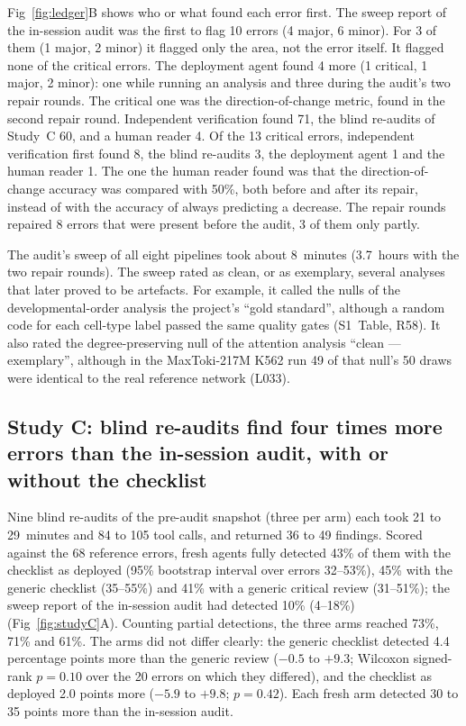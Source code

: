 Fig~\ref{fig:ledger}B shows who or what found each error first. The
sweep report of the in-session audit was the first to flag 10 errors (4
major, 6 minor). For 3 of them (1 major, 2 minor) it flagged only the
area, not the error itself. It flagged none of the critical errors. The
deployment agent found 4 more (1 critical, 1 major, 2 minor): one while
running an analysis and three during the audit's two repair rounds. The
critical one was the direction-of-change metric, found in the second
repair round. Independent verification found 71, the blind re-audits of
Study~C 60, and a human reader 4. Of the 13 critical errors, independent
verification first found 8, the blind re-audits 3, the deployment agent 1
and the human reader 1. The one the human reader found was that the
direction-of-change accuracy was compared with 50\%, both before and after
its repair, instead of with the accuracy of always predicting a decrease.
The repair rounds repaired 8 errors that were present before the audit,
3 of them only partly.

The audit's sweep of all eight pipelines took about 8~minutes (3.7~hours
with the two repair rounds). The sweep rated as
clean, or as exemplary, several analyses that later proved to be
artefacts. For example, it called the nulls of the developmental-order
analysis the project's ``gold standard'', although a random code for each
cell-type label passed the same quality gates (S1~Table, R58). It also
rated the degree-preserving null of the attention analysis ``clean ---
exemplary'', although in the MaxToki-217M K562 run 49 of that null's 50
draws were identical to the real reference network (L033).

\subsection*{Study C: blind re-audits find four times more errors than the in-session audit, with or without the checklist}
Nine blind re-audits of the pre-audit snapshot (three per arm) each took
21 to 29~minutes and 84 to 105 tool calls, and returned 36 to 49
findings. Scored against the 68 reference errors, fresh agents fully
detected 43\% of them with the checklist as deployed (95\% bootstrap
interval over errors 32--53\%), 45\% with the generic checklist
(35--55\%) and 41\% with a generic critical review (31--51\%); the sweep
report of the in-session audit had detected 10\% (4--18\%)
(Fig~\ref{fig:studyC}A).
Counting partial detections, the three arms reached 73\%, 71\% and 61\%.
The arms did not differ clearly: the generic checklist detected 4.4
percentage points more than the generic review ($-0.5$ to $+9.3$;
Wilcoxon signed-rank $p=0.10$ over the 20 errors on which they differed),
and the checklist as deployed 2.0 points more ($-5.9$ to $+9.8$;
$p=0.42$). Each fresh arm detected 30 to 35 points more than the in-session
audit.

